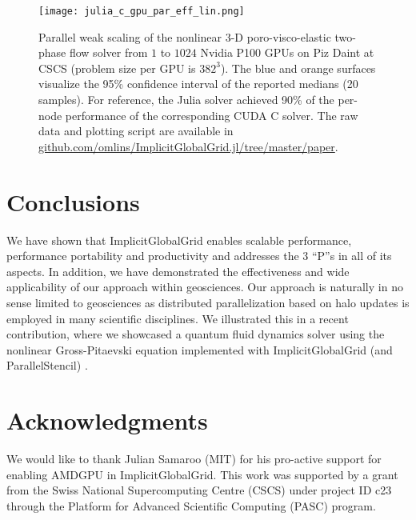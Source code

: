 \documentclass{juliacon}
\begin{document}
\begin{figure}[t]
    \centerline{\texttt{[image: julia\_c\_gpu\_par\_eff\_lin.png]}}
    \caption{Parallel weak scaling of the nonlinear 3-D poro-visco-elastic two-phase flow solver from $1$ to $1024$ Nvidia P100 GPUs on Piz Daint at CSCS (problem size per GPU is $382^\mathrm{3}$). The blue and orange surfaces visualize the 95\% confidence interval of the reported medians (20 samples). For reference, the Julia solver achieved 90\% of the per-node performance of the corresponding CUDA C solver. The raw data and plotting script are available in \url{github.com/omlins/ImplicitGlobalGrid.jl/tree/master/paper}.}
	\label{fig:weak_scaling_realworld}
\end{figure}

\section{Conclusions}
We have shown that ImplicitGlobalGrid enables scalable performance, performance portability and productivity and addresses the 3 ``P''s in all of its aspects. In addition, we have demonstrated the effectiveness and wide applicability of our approach within geosciences. Our approach is naturally in no sense limited to geosciences as distributed parallelization based on halo updates is employed in many scientific disciplines. We illustrated this in a recent contribution, where we showcased a quantum fluid dynamics solver using the nonlinear Gross-Pitaevski equation implemented with ImplicitGlobalGrid (and ParallelStencil) \cite{pasc21}.

\section{Acknowledgments}
We would like to thank Julian Samaroo (MIT) for his pro-active support for enabling AMDGPU in ImplicitGlobalGrid. This work was supported by a grant from the Swiss National Supercomputing Centre (CSCS) under project ID c23 through the Platform for Advanced Scientific Computing (PASC) program.


\end{document}
